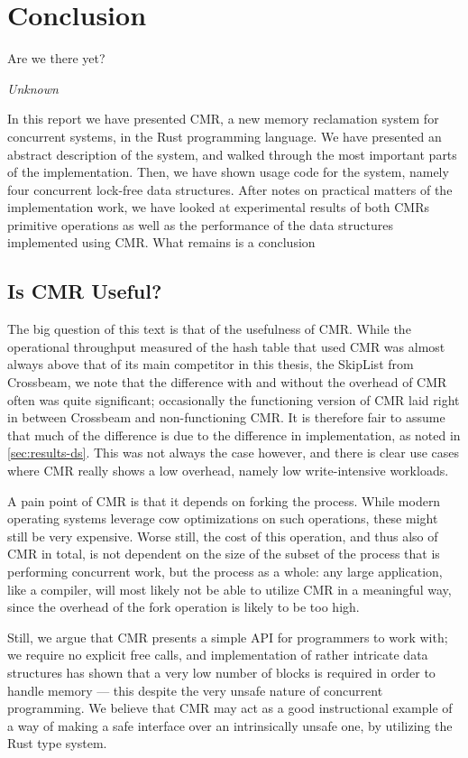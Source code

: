 \chapter{Conclusion\label{ch:conclusion}}
\epigraph{Are we there yet?}{\textit{Unknown}}

In this report we have presented CMR, a new memory reclamation system for concurrent systems, in
the Rust programming language. We have presented an abstract description of the system, and walked
through the most important parts of the implementation. Then, we have shown usage code for the
system, namely four concurrent lock-free data structures. After notes on practical matters of the
implementation work, we have looked at experimental results of both CMRs primitive operations as
well as the performance of the data structures implemented using CMR\@. What remains is a
conclusion

\clearpage

\section{Is CMR Useful?}

The big question of this text is that of the usefulness of CMR\@. While the operational throughput
measured of the hash table that used CMR was almost always above that of its main competitor in
this thesis, the SkipList from Crossbeam, we note that the difference with and without the overhead
of CMR often was quite significant; occasionally the functioning version of CMR laid right in
between Crossbeam and non-functioning CMR\@.  It is therefore fair to assume that much of the
difference is due to the difference in implementation, as noted in \cref{sec:results-ds}. This was
not always the case however, and there is clear use cases where CMR really shows a low overhead,
namely low write-intensive workloads.

A pain point of CMR is that it depends on forking the process. While modern operating systems
leverage \gls{cow} optimizations on such operations, these might still be very expensive.  Worse
still, the cost of this operation, and thus also of CMR in total, is not dependent on the size of
the subset of the process that is performing concurrent work, but the process as a whole: any large
application, like a compiler, will most likely not be able to utilize CMR in a meaningful way,
since the overhead of the fork operation is likely to be too high.

Still, we argue that CMR presents a simple API for programmers to work with; we require no explicit
free calls, and implementation of rather intricate data structures has shown that a very low number
of  blocks is required in order to handle memory --- this despite the very unsafe
nature of concurrent programming. We believe that CMR may act as a good instructional example of
a way of making a safe interface over an intrinsically unsafe one, by utilizing the Rust type system.


